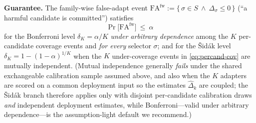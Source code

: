 \begin{theorem}
\textbf{Guarantee.} The family-wise false-adapt event
$\mathrm{FA}^{\mathrm{fw}}:=\{\,\sigma\in S\ \wedge\ \Delta_\sigma\le0\,\}$
(``a harmful candidate is committed'') satisfies
\begin{equation}
\boxed{\ \Pr\big[\mathrm{FA}^{\mathrm{fw}}\big]\ \le\ \alpha\ }
\end{equation}
for the Bonferroni level $\delta_K=\alpha/K$ \emph{under arbitrary dependence} among the
$K$ per-candidate coverage events and \emph{for every} selector $\sigma$; and for the
\v Sid\'ak level $\delta_K=1-(1-\alpha)^{1/K}$ when the $K$ under-coverage events in
\eqref{eq:percand-cov} are mutually independent. (Mutual independence generally \emph{fails} under
the shared exchangeable calibration sample assumed above, and also when the $K$ adapters are scored
on a common deployment input so the estimates $\hat\Delta_k$ are coupled; the \v Sid\'ak branch
therefore applies only with disjoint per-candidate calibration draws \emph{and} independent
deployment estimates, while Bonferroni---valid under arbitrary dependence---is the assumption-light
default we recommend.)
\end{theorem}

